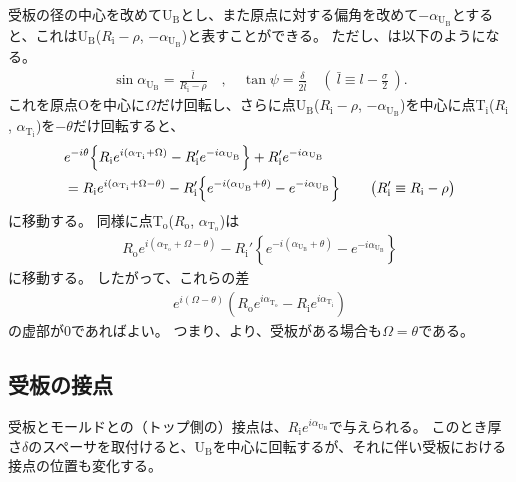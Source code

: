 受板の径の中心を改めてU$_\mathrm B$とし、また原点に対する偏角を改めて$-\alpha_{\mathrm U_\mathrm B}$とすると、これはU$_\mathrm B$($R_\mathrm i-\rho$, $-\alpha_{\mathrm U_\mathrm B}$)と表すことができる。
ただし、は以下のようになる。
\begin{align*}
  \sin\alpha_{\mathrm U_\mathrm B} = \frac{\bar l}{R_\mathrm i-\rho}\quad, \quad
  \tan\psi = \frac\delta{2\bar l} \quad
  \left(~\bar l \equiv l-\frac\sigma2~\right).
\end{align*}
これを原点Oを中心に$\Omega$だけ回転し、さらに点U$_\mathrm B$($R_\mathrm i-\rho$, $-\alpha_{\mathrm U_\mathrm B}$)を中心に点T$_\mathrm i$($R_\mathrm i$, $\alpha_{\mathrm T_\mathrm i}$)を$-\theta$だけ回転すると、
\begin{align}
  \notag
  & e^{-i\theta}\!
    \left\{R_\mathrm ie^{i(\alpha_{\mathrm T_\mathrm i}+\Omega)}
           -R_\mathrm i'e^{-i\alpha_{\mathrm U_\mathrm B}}\right\}
    +R_\mathrm i'e^{-i\alpha_{\mathrm U_\mathrm B}}\\
  & = R_\mathrm ie^{i(\alpha_{\mathrm T_\mathrm i}+\Omega-\theta)}
      -R_\mathrm i'\!
       \left\{e^{-i(\alpha_{\mathrm U_\mathrm B}+\theta)}-e^{-i\alpha_{\mathrm U_\mathrm B}}\right\}\qquad
    \big(R_\mathrm i' \equiv R_\mathrm i-\rho\big)
    \label{eq:afterftUfinite}
\end{align}
に移動する。
同様に点T$_\mathrm o$($R_\mathrm o$, $\alpha_{\mathrm T_\mathrm o}$)は
\begin{align*}
  R_\mathrm oe^{i(\alpha_{\mathrm T_\mathrm o}+\Omega-\theta)}
  -R_\mathrm i'\!
   \left\{e^{-i(\alpha_{\mathrm U_\mathrm B} + \theta)} - e^{-i\alpha_{\mathrm U_\mathrm B}}\right\}
\end{align*}
に移動する。
したがって、これらの差
\begin{align*}
  e^{i(\Omega-\theta)}\!
  \left(R_\mathrm oe^{i\alpha_{\mathrm T_\mathrm o}} - R_\mathrm ie^{i\alpha_{\mathrm T_\mathrm i}}\right)
\end{align*}
の虚部が$0$であればよい。
つまり、より、受板がある場合も$\Omega = \theta$である。



\subsection{受板の接点}
受板とモールドとの（トップ側の）接点は、$R_\mathrm ie^{i\alpha_{\mathrm U_\mathrm B}}$で与えられる。
このとき厚さ$\delta$のスペーサを取付けると、U$_\mathrm B$を中心に回転するが、それに伴い受板における接点の位置も変化する。



